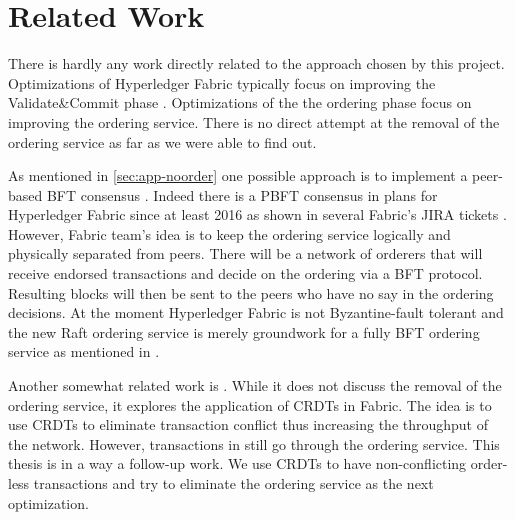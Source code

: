 \chapter{Related Work}
\label{chapter:relatedWork}

There is hardly any work directly related to the approach chosen by this project. Optimizations of Hyperledger Fabric typically focus on improving the Validate\&Commit phase \cite{lit:fabopt, lit:fabopt2, lit:fabopt3}. Optimizations of the the ordering phase focus on improving the ordering service. There is no direct attempt at the removal of the ordering service as far as we were able to find out.

As mentioned in \ref{sec:app-noorder} one possible approach is to implement a peer-based BFT consensus \cite{lit:BFT-ordering, lit:tender}. Indeed there is a PBFT consensus in plans for Hyperledger Fabric since at least 2016 as shown in several Fabric's JIRA tickets \cite{lit:fab-33, lit:fab-378}. However, Fabric team's idea is to keep the ordering service logically and physically separated from peers. There will be a network of orderers that will receive endorsed transactions and decide on the ordering via a BFT protocol. Resulting blocks will then be sent to the peers who have no say in the ordering decisions. At the moment Hyperledger Fabric is not Byzantine-fault tolerant and the new Raft ordering service is merely groundwork for a fully BFT ordering service as mentioned in \cite{fabricdocs:orderer}.

Another somewhat related work is \cite{lit:fabriccrdt}. While it does not discuss the removal of the ordering service, it explores the application of CRDTs in Fabric. The idea is to use CRDTs to eliminate transaction conflict thus increasing the throughput of the network. However, transactions in \cite{lit:fabriccrdt} still go through the ordering service. This thesis is in a way a follow-up work. We use CRDTs to have non-conflicting order-less transactions and try to eliminate the ordering service as the next optimization.

